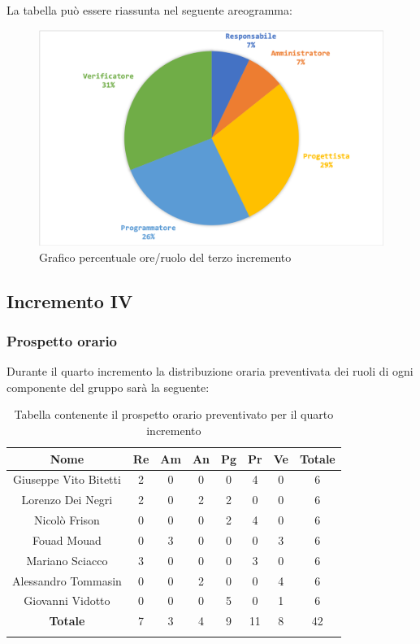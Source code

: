 		La tabella può essere riassunta nel seguente areogramma:
		\begin{figure}[H]
			\centering
			\includegraphics[width=0.8\linewidth]{./images/preventivo/incremento3-2.png}
			\caption{Grafico percentuale ore/ruolo del terzo incremento}
			\label{fig:grafico costi ruolo incremento III}
		\end{figure}
		
		
		
	\subsection{Incremento IV}
		\subsubsection{Prospetto orario}
		Durante il quarto incremento la distribuzione oraria preventivata dei ruoli di ogni componente del gruppo sarà la seguente:
		
		\begin{longtable}{|c|c|c|c|c|c|c|c|}
			\hline
			\rowcolor{lighter-grayer}
			\textbf{Nome} & \textbf{Re} & \textbf{Am} & \textbf{An} & \textbf{Pg}  & \textbf{Pr}   & \textbf{Ve} & \textbf{Totale} \\
			\hline
			\endfirsthead
			
			\hline
			Giuseppe Vito Bitetti 		 & 2 & 0 & 0 & 0 & 4 & 0 & 6\\
			\hline
			\hline
			Lorenzo Dei Negri			 & 2 & 0 & 2 & 2 & 0 & 0 & 6\\
			\hline
			\hline
			Nicolò Frison				    & 0 & 0 & 0 & 2 & 4 & 0 & 6\\
			\hline
			\hline
			Fouad Mouad 				 & 0 & 3 & 0 & 0 & 0 & 3 & 6\\
			\hline
			\hline
			Mariano Sciacco 			 & 3 & 0 & 0 & 0 & 3 & 0 & 6\\
			\hline
			\hline
			Alessandro Tommasin     & 0 & 0 & 2 & 0 & 0 & 4 & 6\\
			\hline
			\hline
			Giovanni Vidotto 			 & 0 & 0 & 0 & 5 & 0 & 1 & 6\\
			\hline 
			\textbf{Totale}			 		& 7 & 3 & 4 & 9 & 11 & 8 & 42\\
			\hline
			\caption{Tabella contenente il prospetto orario preventivato per il quarto incremento}
		\end{longtable}
		\pagebreak
		
